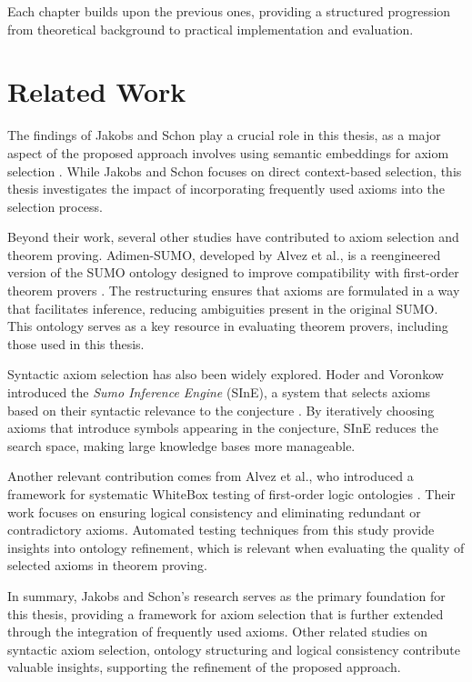 \documentclass[english,version-2020-11]{uzl-thesis}
\begin{document}
Each chapter builds upon the previous ones, providing a structured progression from theoretical background to practical implementation and evaluation.


\chapter{Related Work}
\label{chapter-relatedwork}
The findings of Jakobs and Schon play a crucial role in this thesis, as a major aspect of the proposed approach involves using semantic embeddings for axiom selection \cite{Schon2024}.
While Jakobs and Schon focuses on direct context-based selection, this thesis investigates the impact of incorporating frequently used axioms into the selection process.

Beyond their work, several other studies have contributed to axiom selection and theorem proving. Adimen-SUMO, developed by Alvez et al., is a reengineered version of the SUMO ontology designed to improve compatibility with first-order theorem provers \cite{Alvez2014}. The restructuring ensures that axioms are formulated in a way that facilitates inference, reducing ambiguities present in the original SUMO. This ontology serves as a key resource in evaluating theorem provers, including those used in this thesis.

Syntactic axiom selection has also been widely explored. Hoder and Voronkow introduced the \textit{Sumo Inference Engine} (SInE), a system that selects axioms based on their syntactic relevance to the conjecture \cite{Hoder2011}. By iteratively choosing axioms that introduce symbols appearing in the conjecture, SInE reduces the search space, making large knowledge bases more manageable.

Another relevant contribution comes from Alvez et al., who introduced a framework for systematic WhiteBox testing of first-order logic ontologies \cite{Alvez2017}. Their work focuses on ensuring logical consistency and eliminating redundant or contradictory axioms. Automated testing techniques from this study provide insights into ontology refinement, which is relevant when evaluating the quality of selected axioms in theorem proving.

In summary, Jakobs and Schon's research serves as the primary foundation for this thesis, providing a framework for axiom selection that is further extended through the integration of frequently used axioms. Other related studies on syntactic axiom selection, ontology structuring and logical consistency contribute valuable insights, supporting the refinement of the proposed approach.
\end{document}
